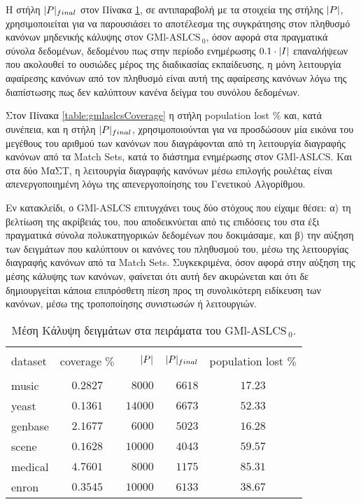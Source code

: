Η στήλη $\lvert P\rvert_{final}$ στον Πίνακα \ref{table:gmlaslcs0coverage}, σε αντιπαραβολή με τα στοιχεία της στήλης $\lvert P\rvert$, χρησιμοποιείται για να παρουσιάσει το αποτέλεσμα της συγκράτησης στον πληθυσμό κανόνων μηδενικής κάλυψης στον GMl-ASLCS$_{\:0}$, όσον αφορά στα πραγματικά σύνολα δεδομένων, δεδομένου πως στην περίοδο ενημέρωσης $0.1 \cdot \lvert I\rvert$ επαναλήψεων που ακολουθεί το ουσιώδες μέρος της διαδικασίας εκπαίδευσης, η μόνη λειτουργία αφαίρεσης κανόνων από τον πληθυσμό είναι αυτή της αφαίρεσης κανόνων λόγω της διαπίστωσης πως δεν καλύπτουν κανένα δείγμα του συνόλου δεδομένων.

Στον Πίνακα \ref{table:gmlaslcsCoverage} η στήλη population lost $\%$ και, κατά συνέπεια, και η στήλη $\lvert P\rvert_{final}$, χρησιμοποιούνται για να προσδώσουν μία εικόνα του μεγέθους του αριθμού των κανόνων που διαγράφονται από τη λειτουργία διαγραφής κανόνων από τα Match Sets, κατά το διάστημα ενημέρωσης στον GMl-ASLCS. Και στα δύο ΜαΣΤ, η λειτουργία διαγραφής κανόνων μέσω επιλογής ρουλέτας είναι απενεργοποιημένη λόγω της απενεργοποίησης του Γενετικού Αλγορίθμου.

Εν κατακλείδι, ο GMl-ASLCS επιτυγχάνει τους δύο στόχους που είχαμε θέσει: α) τη βελτίωση της ακρίβειάς του, που αποδεικνύεται από τις επιδόσεις του στα έξι πραγματικά σύνολα πολυκατηγορικών δεδομένων που δοκιμάσαμε, και β) την αύξηση των δειγμάτων που καλύπτουν οι κανόνες του πληθυσμού του, μέσω της λειτουργίας διαγραφής κανόνων από τα Match Sets. Συγκεκριμένα, όσον αφορά στην αύξηση της μέσης κάλυψης των κανόνων, φαίνεται ότι αυτή δεν ακυρώνεται και ότι δε δημιουργείται κάποια επιπρόσθετη πίεση προς τη συνολικότερη ειδίκευση των κανόνων, μέσω της τροποποίησης συνιστωσών ή λειτουργιών.



\begin{table}[!h]
\begin{center}
\caption{Μέση Κάλυψη δειγμάτων στα πειράματα του GMl-ASLCS$_{\:0}$.}
\label{table:gmlaslcs0coverage}
    \begin{tabular}{l|crrc}
    \hline \\ [-2ex]
    dataset & coverage $\%$       & $\lvert P\rvert$ & $\lvert P\rvert_{final}$ & population lost $\%$ \\
    \hline \\ [-2ex]
    music   & $0.2827$  & $8000$    & $6618$            & $17.23$           	\\
    yeast   & $0.1361$  & $14000$   & $6673$            & $52.33$            	\\
    genbase & $2.1677$  & $6000$    & $5023$            & $16.28$            	\\
    scene   & $0.1628$  & $10000$   & $4043$            & $59.57$            	\\
    medical & $4.7601$  & $8000$    & $1175$            & $85.31$            	\\
    enron   & $0.3545$  & $10000$   & $6133$            & $38.67$            	\\ 
    \hline
    \end{tabular}
\end{center}
\end{table}




